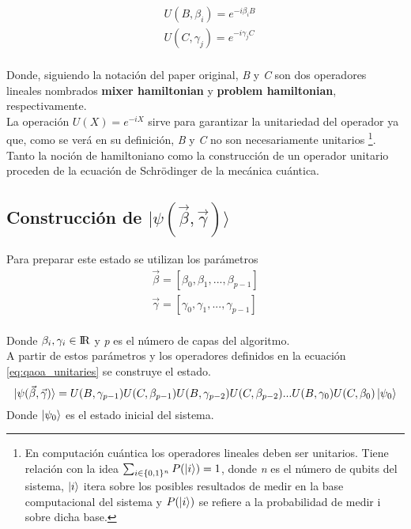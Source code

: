 \documentclass{article}
\begin{document}
\begin{equation}
  \label{eq:qaoa_unitaries}
  \begin{aligned}
    & U(B, \beta_i) = e^{-i \beta_i B} \\
    & U(C, \gamma_j) = e^{-i \gamma_j C} \\
  \end{aligned}
\end{equation}

Donde, siguiendo la notación del paper original, \textit{B} y \textit{C} son dos operadores lineales nombrados \textbf{mixer hamiltonian} y \textbf{problem hamiltonian}, respectivamente.
\\ La operación \(U(X) = e^{-i X}\) sirve para garantizar la unitariedad del operador ya que, como se verá en su definición, \textit{B} y \textit{C} no son necesariamente unitarios
\footnote{En computación cuántica los operadores lineales deben ser unitarios. Tiene relación con la idea
  \(\sum_{i \in \{0, 1\}^{n} } {P(\ket{i})} = 1\),
  donde \textit{n} es el número de qubits del sistema,
  \(\ket{i}\) itera sobre los posibles resultados de medir en la base computacional del sistema y
  \(P(\ket{i})\) se refiere a la probabilidad de medir i sobre dicha base.}.
\\ Tanto la noción de hamiltoniano como la construcción de un operador unitario proceden de la ecuación de Schrödinger de la mecánica cuántica.

\subsection{Construcción de \(\lvert\psi(\vec{\beta}, \vec{\gamma})\rangle\)}
Para preparar este estado se utilizan los parámetros
\begin{align*}
  \vec{\beta} = [\beta_0, \beta_1, ..., \beta_{p-1}] \\
  \vec{\gamma} = [\gamma_0, \gamma_1, ..., \gamma_{p-1}] \\
\end{align*}

Donde \( \beta_i, \gamma_i \in \rm{I\!R} \) y \textit{p} es el número de capas del algoritmo.
\\ A partir de estos parámetros y los operadores definidos en la ecuación \ref{eq:qaoa_unitaries} se construye el estado.
\[
  \lvert\psi(\vec{\beta}, \vec{\gamma})\rangle = U(B, \gamma_{p-1})U(C, \beta_{p-1})U(B, \gamma_{p-2})U(C, \beta_{p-2}) ... U(B, \gamma_0)U(C, \beta_0) \ket{\psi_0}
\]
Donde \(\ket{\psi_0}\) es el estado inicial del sistema.
\end{document}
